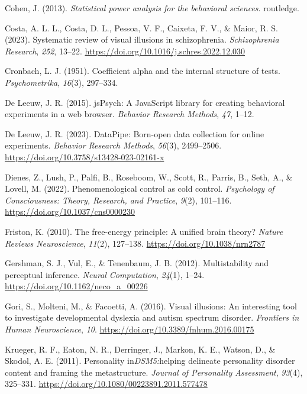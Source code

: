 \documentclass[
  man,
  floatsintext,
  longtable,
  nolmodern,
  notxfonts,
  notimes,
  colorlinks=true,linkcolor=blue,citecolor=blue,urlcolor=blue]{apa7}
\newlength{\cslhangindent}
\newenvironment{CSLReferences}[2] %
 {\begin{list}{}{%
  \setlength{\itemindent}{0pt}
  \setlength{\leftmargin}{0pt}
  \setlength{\parsep}{0pt}
  \ifodd #1
   \setlength{\leftmargin}{\cslhangindent}
   \setlength{\itemindent}{-1\cslhangindent}
  \fi
  \setlength{\itemsep}{#2\baselineskip}}}
 {\end{list}}
\begin{document}
\protect{}\label{refs}
\begin{CSLReferences}{1}{0}
Cohen, J. (2013). \emph{Statistical power analysis for the behavioral
sciences}. routledge.

Costa, A. L. L., Costa, D. L., Pessoa, V. F., Caixeta, F. V., \& Maior,
R. S. (2023). Systematic review of visual illusions in schizophrenia.
\emph{Schizophrenia Research}, \emph{252}, 13--22.
\url{https://doi.org/10.1016/j.schres.2022.12.030}

Cronbach, L. J. (1951). Coefficient alpha and the internal structure of
tests. \emph{Psychometrika}, \emph{16}(3), 297--334.

De Leeuw, J. R. (2015). jsPsych: A JavaScript library for creating
behavioral experiments in a web browser. \emph{Behavior Research
Methods}, \emph{47}, 1--12.

De Leeuw, J. R. (2023). DataPipe: Born-open data collection for online
experiments. \emph{Behavior Research Methods}, \emph{56}(3), 2499--2506.
\url{https://doi.org/10.3758/s13428-023-02161-x}

Dienes, Z., Lush, P., Palfi, B., Roseboom, W., Scott, R., Parris, B.,
Seth, A., \& Lovell, M. (2022). Phenomenological control as cold
control. \emph{Psychology of Consciousness: Theory, Research, and
Practice}, \emph{9}(2), 101--116.
\url{https://doi.org/10.1037/cns0000230}

Friston, K. (2010). The free-energy principle: A unified brain theory?
\emph{Nature Reviews Neuroscience}, \emph{11}(2), 127--138.
\url{https://doi.org/10.1038/nrn2787}

Gershman, S. J., Vul, E., \& Tenenbaum, J. B. (2012). Multistability and
perceptual inference. \emph{Neural Computation}, \emph{24}(1), 1--24.
\url{https://doi.org/10.1162/neco_a_00226}

Gori, S., Molteni, M., \& Facoetti, A. (2016). Visual illusions: An
interesting tool to investigate developmental dyslexia and autism
spectrum disorder. \emph{Frontiers in Human Neuroscience}, \emph{10}.
\url{https://doi.org/10.3389/fnhum.2016.00175}

Krueger, R. F., Eaton, N. R., Derringer, J., Markon, K. E., Watson, D.,
\& Skodol, A. E. (2011). Personality
in{\emph{DSM{\textendash}5:}}helping delineate personality disorder
content and framing the metastructure. \emph{Journal of Personality
Assessment}, \emph{93}(4), 325--331.
\url{https://doi.org/10.1080/00223891.2011.577478}


\end{CSLReferences}
\end{document}
